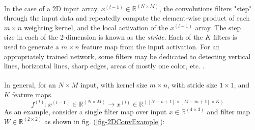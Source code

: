 \documentclass[12pt,letterpaper]{article}
\begin{document}
\paragraph*{}In the case of a 2D input array, $x^{(l-1)} \in \mathbb{R}^{(N \times M)}$, the convolutions filters "step" through the input data and repeatedly compute the element-wise product of each $m \times n$ weighting kernel, and the local activation of the $x^{(l-1)}$ array. The step size in each of the 2-dimension is known as the \textit{stride}. Each of the $K$ filters is used to generate a $m \times n$ feature map from the input activation. For an appropriately trained network, some filters may be dedicated to detecting vertical lines, horizontal lines, sharp edges, areas of mostly one color, etc. \cite{Loy,Geron}.

\paragraph*{}In general, for an $N \times M$ input, with kernel size $m \times n$, with stride size $1 \times 1$, and $K$ feature maps.
\begin{equation}
f^{(l)} : x^{(l-1)} \in \mathbb{R}^{(N \times M)} \rightarrow
x^{(l)} \in \mathbb{R}^{([N-n+1] \times [M-m+1] \times K)}
\end{equation}
As an example, consider a single filter map over input $x \in \mathbb{R}^{(4 \times 3)}$ and filter map $W \in \mathbb{R}^{(2 \times 2)}$ as shown in fig. (\ref{fig-2DConvExample}):
\end{document}
